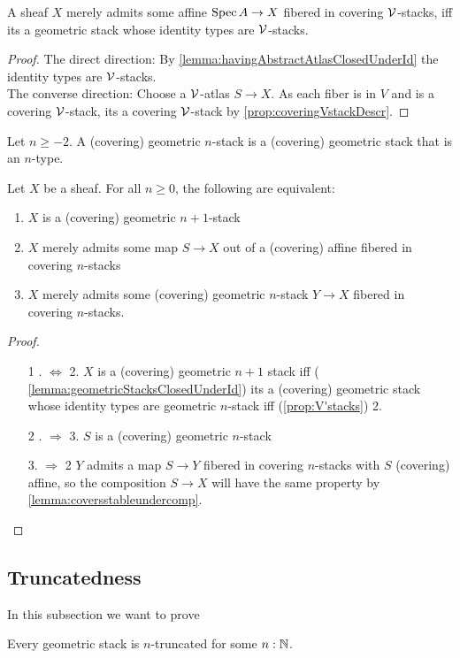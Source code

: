 \documentclass{article}
\begin{document}
\begin{prop}{\label{prop:V'stacks}}
	A sheaf $X$ merely admits some affine $\operatorname{Spec} A \to X$ fibered in covering $\mathcal{V}$-stacks, iff its a geometric stack whose identity types are $\mathcal{V}$-stacks. \\	
\end{prop}
\begin{proof}
	The direct direction: By \ref{lemma:havingAbstractAtlasClosedUnderId} the identity types are $\mathcal{V}$-stacks. \\
	The converse direction: Choose a $\mathcal{V}$-atlas $S \to X$. As each fiber is in $V$ and is a covering $\mathcal{V}$-stack, its a covering $\mathcal{V}$-stack by \ref{prop:coveringVstackDescr}.
\end{proof}
\begin{definition}
	Let $n \ge -2$. A (covering) geometric $n$-stack is a (covering) geometric stack that is an $n$-type.
\end{definition}
\begin{prop}
	Let $X$ be a sheaf. For all $n \ge 0$, the following are equivalent:
	\begin{enumerate}
		\item $X$ is a (covering) geometric $n+1$-stack
		\item $X$ merely admits some map $S \to X$ out of a (covering) affine fibered in covering $n$-stacks
		\item $X$ merely admits some (covering) geometric $n$-stack $Y \to X$ fibered in covering $n$-stacks.
	\end{enumerate}
\end{prop}
\begin{proof}
	\
	\begin{enumerate}
	\item[1 . $\Leftrightarrow$ 2.]
	$X$ is a (covering) geometric $n+1$ stack iff ( \ref{lemma:geometricStacksClosedUnderId}) its a (covering) geometric stack whose identity types are geometric $n$-stack iff (\ref{prop:V'stacks}) 2. 
	\item[2 . $\Rightarrow$ 3.]
	$S$ is a (covering) geometric $n$-stack
	\item [3. $\Rightarrow$ 2]
	$Y$ admits a map $S \to Y$  fibered in covering $n$-stacks with $S$ (covering) affine, so the composition $S \to X$ will have the same property by \ref{lemma:coversstableundercomp}.
		\end{enumerate}
\end{proof}
\subsection{Truncatedness}
In this subsection we want to prove
\begin{theorem}
	Every geometric stack is $n$-truncated for some $n : \mathbb{N}$.
\end{theorem}
\end{document}
